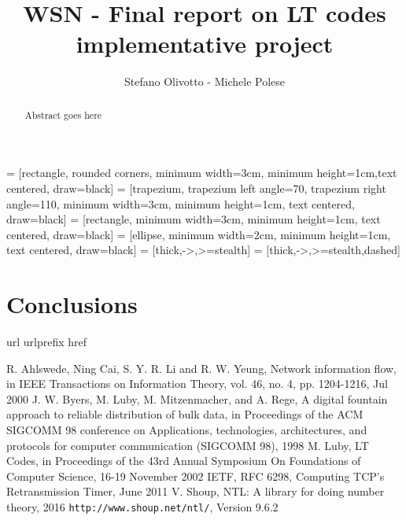 \documentclass[12pt]{article}
\begin{document}
\title{WSN - Final report on LT codes implementative project}
\author{Stefano Olivotto - Michele Polese}
\maketitle

 = [rectangle, rounded corners, minimum width=3cm, minimum height=1cm,text centered, draw=black]
 = [trapezium, trapezium left angle=70, trapezium right angle=110, minimum width=3cm, minimum height=1cm, text centered, draw=black]
 = [rectangle, minimum width=3cm, minimum height=1cm, text centered, draw=black]
 = [ellipse, minimum width=2cm, minimum height=1cm, text centered, draw=black]
 = [thick,->,>=stealth]
 = [thick,->,>=stealth,dashed]

\begin{abstract}
Abstract goes here
\end{abstract}





\section{Conclusions}\label{sec:concl}


\begin{thebibliography}{10}
\expandafter\ifx\csname url\endcsname\relax
  \def\url#1{\texttt{#1}}\fi
\expandafter\ifx\csname urlprefix\endcsname\relax\def\urlprefix{URL }\fi
\expandafter\ifx\csname href\endcsname\relax
  \def\href#1#2{#2} \def\path#1{#1}\fi
  

  R. Ahlswede, Ning Cai, S. Y. R. Li and R. W. Yeung, Network information flow, in IEEE Transactions on Information Theory, vol. 46, no. 4, pp. 1204-1216, Jul 2000
 J. W. Byers, M. Luby, M. Mitzenmacher, and A. Rege, A digital fountain approach to reliable distribution of bulk data, in Proceedings of the ACM SIGCOMM 98 conference on Applications, technologies, architectures, and protocols for computer communication (SIGCOMM 98), 1998 
 M. Luby, LT Codes, in Proceedings of the 43rd Annual Symposium On Foundations of Computer Science, 16-19 November 2002
 IETF, RFC 6298, Computing TCP's Retransmission Timer, June 2011
 V. Shoup, NTL: A library for doing number theory, 2016 \url{http://www.shoup.net/ntl/}, Version 9.6.2
\end{thebibliography}
\end{document}
